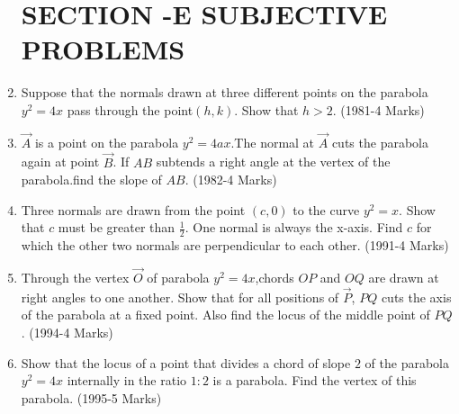 \documentclass[journal,12pt,onecolumn]{IEEEtran}
\theoremstyle{remark}
\begin{document}
\begin{enumerate}
		\section{SECTION -E SUBJECTIVE PROBLEMS}
	\item Suppose that the normals drawn at three different points on the parabola $y^2=4x$ pass through the point$(h,k)$. Show that $h>2$. 
		\hfill(1981-4 Marks)
		
	\item $\vec{A}$ is a point on the parabola $y^2=4ax$.The normal at $\vec{A}$ cuts the parabola again at point $\vec{B}$. If $AB$ subtends a right angle at the vertex of the parabola.find the slope of $AB$.  
		\hfill(1982-4 Marks)
		
	\item Three normals are drawn from the point $(c,0)$ to the curve $y^2=x$. Show that $c$ must be greater than $\frac{1}{2}$. One normal is always the x-axis. Find $c$ for which the other two normals are perpendicular to each other. 
	      \hfill(1991-4 Marks)
		
      \item Through the vertex $\vec{O}$ of parabola $y^2=4x$,chords $OP$ and $OQ$ are drawn at right angles to one another. Show that for all positions of $\vec{P}$, $PQ$ cuts the axis of the parabola at a fixed point. Also find the locus of the middle point of $PQ$. 
		\hfill(1994-4 Marks)
		
      \item Show that the locus of a point that divides a chord of slope $2$ of the parabola $y^2=4x$ internally in the ratio $1:2$ is a parabola. Find the vertex of this parabola. 
	      \hfill(1995-5 Marks)


\end{enumerate}
\end{document}
